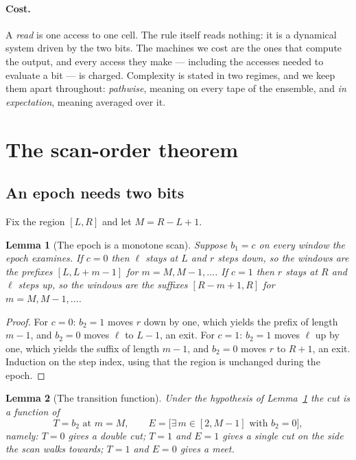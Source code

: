 \documentclass[11pt]{article}
\newtheorem{lemma}{Lemma}
\begin{document}
\paragraph{Cost.} A \emph{read} is one access to one cell. The rule itself reads nothing:
it is a dynamical system driven by the two bits. The machines we cost are the ones that
compute the output, and every access they make --- including the accesses needed to
evaluate a bit --- is charged. Complexity is stated in two regimes, and we keep them apart
throughout: \emph{pathwise}, meaning on every tape of the ensemble, and \emph{in
expectation}, meaning averaged over it.

\section{The scan-order theorem}\label{sec:order}

\subsection{An epoch needs two bits}

Fix the region $[L,R]$ and let $M=R-L+1$.

\begin{lemma}[The epoch is a monotone scan]\label{lem:monotone}
Suppose $b_1=c$ on every window the epoch examines. If $c=0$ then $\ell$ stays at $L$ and
$r$ steps down, so the windows are the prefixes $[L,L+m-1]$ for $m=M,M-1,\dots$. If $c=1$
then $r$ stays at $R$ and $\ell$ steps up, so the windows are the suffixes $[R-m+1,R]$ for
$m=M,M-1,\dots$.
\end{lemma}

\begin{proof}
For $c=0$: $b_2=1$ moves $r$ down by one, which yields the prefix of length $m-1$, and
$b_2=0$ moves $\ell$ to $L-1$, an exit. For $c=1$: $b_2=1$ moves $\ell$ up by one, which
yields the suffix of length $m-1$, and $b_2=0$ moves $r$ to $R+1$, an exit. Induction on
the step index, using that the region is unchanged during the epoch.
\end{proof}

\begin{lemma}[The transition function]\label{lem:transition}
Under the hypothesis of Lemma~\ref{lem:monotone} the cut is a function of
\[
T=b_2\text{ at }m=M,\qquad E=\big[\exists\, m\in[2,M-1]\text{ with }b_2=0\big],
\]
namely: $T=0$ gives a double cut; $T=1$ and $E=1$ gives a single cut on the side the scan
walks towards; $T=1$ and $E=0$ gives a meet.
\end{lemma}
\end{document}
